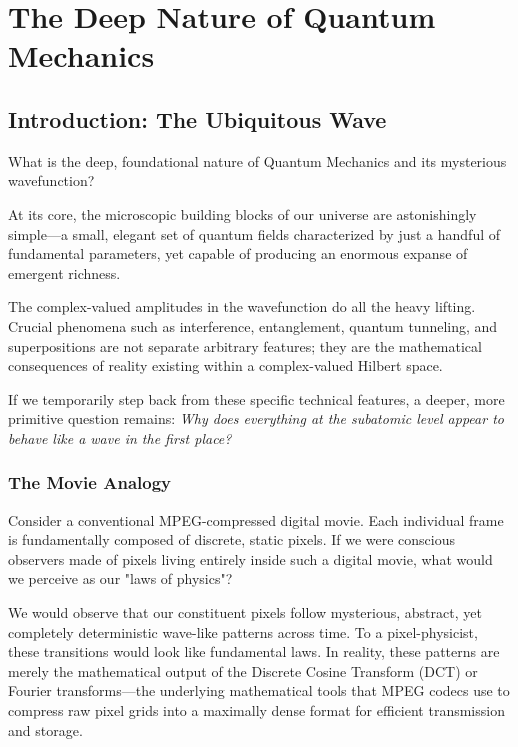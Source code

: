 \chapter{The Deep Nature of Quantum Mechanics}
\label{chap:qm-as-compression}

\section{Introduction: The Ubiquitous Wave}

What is the deep, foundational nature of Quantum Mechanics and its mysterious wavefunction? 

At its core, the microscopic building blocks of our universe are astonishingly simple—a small, elegant set of quantum fields characterized by just a handful of fundamental parameters, yet capable of producing an enormous expanse of emergent richness.

The complex-valued amplitudes in the wavefunction do all the heavy lifting.
Crucial phenomena such as interference, entanglement, quantum tunneling, and superpositions are not separate arbitrary features; they are the mathematical consequences of reality existing within a complex-valued Hilbert space. 

If we temporarily step back from these specific technical features, a deeper, more primitive question remains: \emph{Why does everything at the subatomic level appear to behave like a wave in the first place?}

\subsection*{The Movie Analogy}

Consider a conventional MPEG-compressed digital movie.
Each individual frame is fundamentally composed of discrete, static pixels.
If we were conscious observers made of pixels living entirely inside such a digital movie, what would we perceive as our "laws of physics"?

We would observe that our constituent pixels follow mysterious, abstract, yet completely deterministic wave-like patterns across time.
To a pixel-physicist, these transitions would look like fundamental laws.
In reality, these patterns are merely the mathematical output of the Discrete Cosine Transform (DCT) or Fourier transforms—the underlying mathematical tools that MPEG codecs use to compress raw pixel grids into a maximally dense format for efficient transmission and storage.

